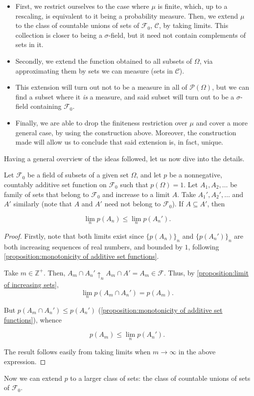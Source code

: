 \begin{itemize}
	\item First, we restrict ourselves to the case where \(\mu\) is finite,
which, up to a rescaling, is equivalent to it being a probability measure. Then,
we extend \(\mu\) to the class of countable unions of sets of \(\mathcal{F}_0\), \(\mathcal{C}\),
by taking limits. This collection is closer to being a \(\sigma\)-field, but it
need not contain complements of sets in it.
	\item Secondly, we extend the function obtained to all subsets of
\(\Omega\), via approximating them by sets we can measure (sets in \(\mathcal{C}\)).
	\item This extension will turn out not to be a measure in all of
\(\mathcal{P}(\Omega)\), but we can find a subset where it \textit{is} a
measure, and said subset will turn out to be a \(\sigma\)-field containing
\(\mathcal{F}_0\).
	\item Finally, we are able to drop the finiteness restriction over \(\mu\)
and cover a more general case, by using the construction above. Moreover, the
construction made will allow us to conclude that said extension is, in fact,
unique.
\end{itemize}

Having a general overview of the ideas followed, let us now dive into the
details.

\begin{lemm}\label{lemma:inequality of limits of increasing sets} Let \(\mathcal{F}_0\)
be a field of subsets of a given set \(\Omega\), and let \(p\) be a nonnegative,
countably additive set function on \(\mathcal{F}_0\) such that \(p(\Omega)=1\). Let
\(A_1,A_2,\dots\) be family of sets that belong to \(\mathcal{F}_0\) and increase to a
limit \(A\). Take \(A_1',A_2',\dots\) and \(A'\) similarly (note that \(A\) and
\(A'\) need not belong to \(\mathcal{F}_{0}\)). If \(A\subseteq A'\), then
	
	\[\lim_np(A_n)\leq\lim_np(A_n').\]
\end{lemm}
\begin{proof} Firstly, note that both limits exist since \(\{p(A_n)\}_n\) and
\(\{p(A_n')\}_n\)  are both increasing sequences of real numbers, and bounded by
\(1\), following \cref{proposition:monotonicity of additive set functions}.
	
	Take \(m\in\mathbb{Z}^+\). Then, \(A_m\cap A_n'\uparrow_n A_m\cap A'=A_m\in\mathcal{F}\).
Thus, by \cref{proposition:limit of increasing sets},
	\[\lim_np(A_m\cap A_n')=p(A_m).\]
	
	But \(p(A_m\cap A_n')\leq p(A_n')\) (\cref{proposition:monotonicity of
additive set functions}), whence
	
	\[p(A_m)\leq\lim_n p(A_n').\]
	
	The result follows easily from taking limits when \(m\to\infty\) in the
above expression.
\end{proof}
Now we can extend \(p\) to a larger class of sets: the class of countable unions
of sets of \(\mathcal{F}_0\).

